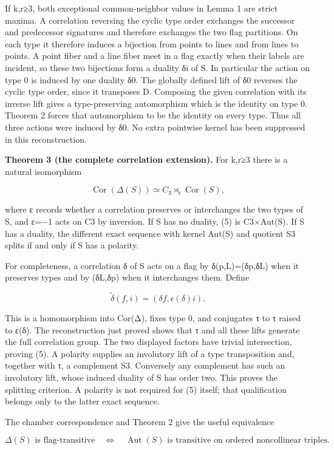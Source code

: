 \documentclass[
  11pt,
  a4paper,
]{article}
\begin{document}
If k,r≥3, both exceptional common-neighbor values in Lemma 1 are strict
maxima. A correlation reversing the cyclic type order exchanges the
successor and predecessor signatures and therefore exchanges the two
flag partitions. On each type it therefore induces a bijection from
points to lines and from lines to points. A point fiber and a line fiber
meet in a flag exactly when their labels are incident, so these two
bijections form a duality δi of S. In particular the action on type 0 is
induced by one duality δ0. The globally defined lift of δ0 reverses the
cyclic type order, since it transposes D. Composing the given
correlation with its inverse lift gives a type-preserving automorphism
which is the identity on type 0. Theorem 2 forces that automorphism to
be the identity on every type. Thus all three actions were induced by
δ0. No extra pointwise kernel has been suppressed in this
reconstruction.

\textbf{Theorem 3 (the complete correlation extension).} For k,r≥3 there
is a natural isomorphism

\[
 \operatorname{Cor}(\Delta(S))\simeq C_3\rtimes_\epsilon
 \operatorname{Cor}(S),
\tag{5}
\]

where ε records whether a correlation preserves or interchanges the two
types of S, and ε=−1 acts on C3 by inversion. If S has no duality, (5)
is C3×Aut(S). If S has a duality, the different exact sequence with
kernel Aut(S) and quotient S3 splits if and only if S has a polarity.

For completeness, a correlation δ of S acts on a flag by δ(p,L)=(δp,δL)
when it preserves types and by (δL,δp) when it interchanges them. Define

\[
 \widetilde\delta(f,i)=(\delta f,\epsilon(\delta)i).
\]

This is a homomorphism into Cor(Δ), fixes type 0, and conjugates τ to τ
raised to ε(δ). The reconstruction just proved shows that τ and all
these lifts generate the full correlation group. The two displayed
factors have trivial intersection, proving (5). A polarity supplies an
involutory lift of a type transposition and, together with τ, a
complement S3. Conversely any complement has such an involutory lift,
whose induced duality of S has order two. This proves the splitting
criterion. A polarity is not required for (5) itself; that qualification
belongs only to the latter exact sequence.

The chamber correspondence and Theorem 2 give the useful equivalence

\[
 \Delta(S)\text{ is flag-transitive}\quad\Longleftrightarrow\quad
 \operatorname{Aut}(S)\text{ is transitive on ordered noncollinear triples}.
\tag{6}
\]
\end{document}
